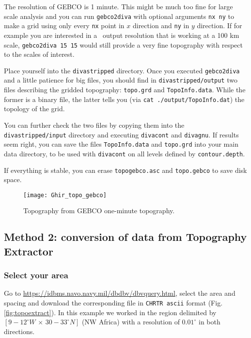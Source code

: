 The resolution of GEBCO is 1 minute. This might be much too fine for large scale analysis and you can run
{\tt gebco2diva} with optional arguments {\tt nx ny} to make a grid using only every {\tt nx} point in $x$ direction and {\tt ny} in $y$ direction. If for example you are interested in a \diva\, output resolution that is working at a 100 km scale, {\tt gebco2diva 15 15} would still provide a very fine topography with respect to the scales of interest.

Place yourself into the {\tt divastripped} directory. Once you executed {\tt gebco2diva} and a little patience for big files, you should find in {\tt divastripped/output} two files describing the gridded topography: {\tt topo.grd} and {\tt TopoInfo.data}. While the former is a binary file, the latter tells you (via {\tt cat ./output/TopoInfo.dat}) the topology of the grid.


You can further check the two files by copying them into the {\tt divastripped/input} directory and executing {\tt divacont} and {\tt divagnu}. If results seem right, you can save the files {\tt TopoInfo.data} and {\tt topo.grd} into your main data directory, to be used with {\tt divacont} on all levels defined by {\tt contour.depth}.

If everything is stable, you can erase {\tt topogebco.asc} and {\tt topo.gebco} to save disk space. 


\begin{figure}[htpb]
\centering
\texttt{[image: Ghir\_topo\_gebco]}
\caption{Topography from GEBCO one-minute topography.\label{fig:topoGebco3}}
\end{figure}

\subsection{Method 2: conversion of data from Topography Extractor\label{sec:toponavy}}

\subsubsection{Select your area}

Go to \url{https://idbms.navo.navy.mil/dbdbv/dbvquery.html}, select the area and spacing and download the corresponding file in \texttt{CHRTR ascii} format (Fig. \ref{fig:topoextract}). In this example we worked in the region delimited by $[9-12^{\circ}W\, \times\, 30-33^{\circ}N]$ (NW Africa) with a resolution of $0.01^{\circ}$ in both directions. 


